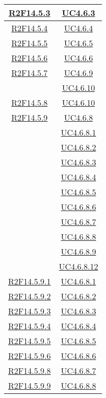 \begin{longtable}{|c|c|}
\hline
\hyperlink{R2F14.5.3}{R2F14.5.3} & \hyperlink{UC4.6.3}{UC4.6.3}\\
\hline
\hyperlink{R2F14.5.4}{R2F14.5.4} & \hyperlink{UC4.6.4}{UC4.6.4}\\
\hline
\hyperlink{R2F14.5.5}{R2F14.5.5} & \hyperlink{UC4.6.5}{UC4.6.5}\\
\hline
\hyperlink{R2F14.5.6}{R2F14.5.6} & \hyperlink{UC4.6.6}{UC4.6.6}\\
\hline
\hyperlink{R2F14.5.7}{R2F14.5.7} & \hyperlink{UC4.6.9}{UC4.6.9}\\
& \hyperlink{UC4.6.10}{UC4.6.10}\\
\hline
\hyperlink{R2F14.5.8}{R2F14.5.8} & \hyperlink{UC4.6.10}{UC4.6.10}\\
\hline
\hyperlink{R2F14.5.9}{R2F14.5.9} & \hyperlink{UC4.6.8}{UC4.6.8}\\
& \hyperlink{UC4.6.8.1}{UC4.6.8.1}\\
& \hyperlink{UC4.6.8.2}{UC4.6.8.2}\\
& \hyperlink{UC4.6.8.3}{UC4.6.8.3}\\
& \hyperlink{UC4.6.8.4}{UC4.6.8.4}\\
& \hyperlink{UC4.6.8.5}{UC4.6.8.5}\\
& \hyperlink{UC4.6.8.6}{UC4.6.8.6}\\
& \hyperlink{UC4.6.8.7}{UC4.6.8.7}\\
& \hyperlink{UC4.6.8.8}{UC4.6.8.8}\\
& \hyperlink{UC4.6.8.9}{UC4.6.8.9}\\
& \hyperlink{UC4.6.8.12}{UC4.6.8.12}\\
\hline
\hyperlink{R2F14.5.9.1}{R2F14.5.9.1} & \hyperlink{UC4.6.8.1}{UC4.6.8.1}\\
\hline
\hyperlink{R2F14.5.9.2}{R2F14.5.9.2} & \hyperlink{UC4.6.8.2}{UC4.6.8.2}\\
\hline
\hyperlink{R2F14.5.9.3}{R2F14.5.9.3} & \hyperlink{UC4.6.8.3}{UC4.6.8.3}\\
\hline
\hyperlink{R2F14.5.9.4}{R2F14.5.9.4} & \hyperlink{UC4.6.8.4}{UC4.6.8.4}\\
\hline
\hyperlink{R2F14.5.9.5}{R2F14.5.9.5} & \hyperlink{UC4.6.8.5}{UC4.6.8.5}\\
\hline
\hyperlink{R2F14.5.9.6}{R2F14.5.9.6} & \hyperlink{UC4.6.8.6}{UC4.6.8.6}\\
\hline
\hyperlink{R2F14.5.9.8}{R2F14.5.9.8} & \hyperlink{UC4.6.8.7}{UC4.6.8.7}\\
\hline
\hyperlink{R2F14.5.9.9}{R2F14.5.9.9} & \hyperlink{UC4.6.8.8}{UC4.6.8.8}\\

\end{longtable}
